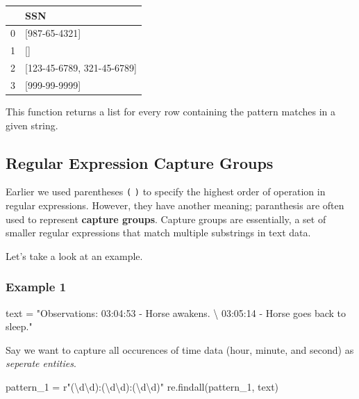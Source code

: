 \documentclass[
  letterpaper,
  DIV=11,
  numbers=noendperiod]{scrreprt}
\newenvironment{Shaded}{\begin{snugshade}}{\end{snugshade}}
\newcommand{\CharTok}[1]{\textcolor[rgb]{0.13,0.47,0.30}{#1}}
\newcommand{\NormalTok}[1]{\textcolor[rgb]{0.00,0.23,0.31}{#1}}
\newcommand{\OperatorTok}[1]{\textcolor[rgb]{0.37,0.37,0.37}{#1}}
\newcommand{\StringTok}[1]{\textcolor[rgb]{0.13,0.47,0.30}{#1}}
\newcommand{\VerbatimStringTok}[1]{\textcolor[rgb]{0.13,0.47,0.30}{#1}}
\begin{document}
\begin{tabular}{ll}
\toprule
{} &                         SSN \\
\midrule
0 &               [987-65-4321] \\
1 &                          [] \\
2 &  [123-45-6789, 321-45-6789] \\
3 &               [999-99-9999] \\
\bottomrule
\end{tabular}

This function returns a list for every row containing the pattern
matches in a given string.

\hypertarget{regular-expression-capture-groups}{%
\subsection{Regular Expression Capture
Groups}\label{regular-expression-capture-groups}}

Earlier we used parentheses \texttt{(} \texttt{)} to specify the highest
order of operation in regular expressions. However, they have another
meaning; paranthesis are often used to represent \textbf{capture
groups}. Capture groups are essentially, a set of smaller regular
expressions that match multiple substrings in text data.

Let's take a look at an example.

\hypertarget{example-1}{%
\subsubsection{Example 1}\label{example-1}}

\begin{Shaded}
\begin{Highlighting}[]
\NormalTok{text }\OperatorTok{=} \StringTok{"Observations: 03:04:53 {-} Horse awakens. }\CharTok{\textbackslash{}}
\StringTok{        03:05:14 {-} Horse goes back to sleep."}
\end{Highlighting}
\end{Shaded}

Say we want to capture all occurences of time data (hour, minute, and
second) as \emph{seperate entities}.

\begin{Shaded}
\begin{Highlighting}[]
\NormalTok{pattern\_1 }\OperatorTok{=} \VerbatimStringTok{r"(\textbackslash{}d\textbackslash{}d):(\textbackslash{}d\textbackslash{}d):(\textbackslash{}d\textbackslash{}d)"}
\NormalTok{re.findall(pattern\_1, text)}
\end{Highlighting}
\end{Shaded}
\end{document}
